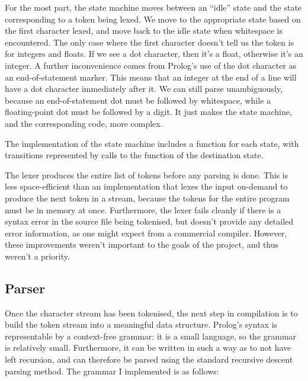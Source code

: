 \documentclass[12pt]{article}
\begin{document}
For the most part, the state machine moves between an ``idle'' state and the state corresponding to a token being lexed. 
We move to the appropriate state based on the first character lexed, and move back to the idle state when whitespace is encountered. 
The only case where the first character doesn't tell us the token is for integers and floats. 
If we see a dot character, then it's a float, otherwise it's an integer. 
A further inconvenience comes from Prolog's use of the dot character as an end-of-statement marker. 
This means that an integer at the end of a line will have a dot character immediately after it. 
We can still parse unambiguously, because an end-of-statement dot must be followed by whitespace, while a floating-point dot must be followed by a digit. 
It just makes the state machine, and the corresponding code, more complex.

The implementation of the state machine includes a function for each state, with transitions represented by calls to the function of the destination state.

The lexer produces the entire list of tokens before any parsing is done. 
This is less space-efficient than an implementation that lexes the input on-demand to produce the next token in a stream, because the tokens for the entire program must be in memory at once. 
Furthermore, the lexer fails cleanly if there is a syntax error in the source file being tokenised, but doesn't provide any detailed error information, as one might expect from a commercial compiler. 
However, these improvements weren't important to the goals of the project, and thus weren't a priority.

\subsection{Parser}

Once the character stream has been tokenised, the next step in compilation is to build the token stream into a meaningful data structure. 
Prolog's syntax is representable by a context-free grammar: it is a small language, so the grammar is relatively small. 
Furthermore, it can be written in such a way as to not have left recursion, and can therefore be parsed using the standard recursive descent parsing method. 
The grammar I implemented is as follows:

\newpage
\end{document}
